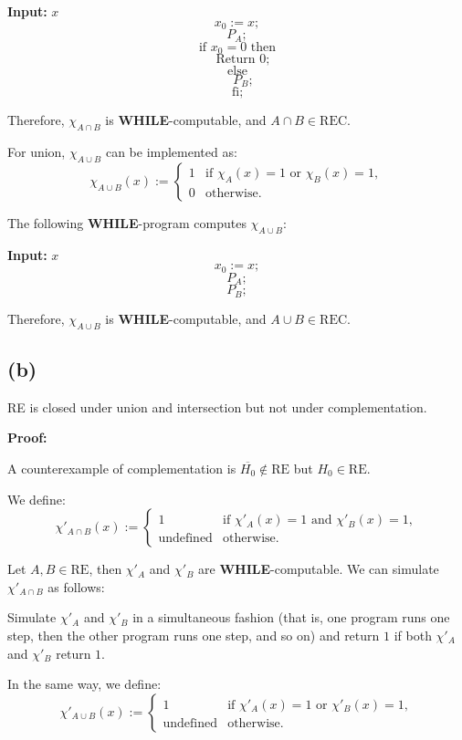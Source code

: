 \bigskip

\textbf{Input:} $x$
\[
x_0 := x;
\]
\[
P_A;
\]
\[
\text{if } x_0 = 0 \text{ then}
\]
\[
\quad \text{Return } 0;
\]
\[
\text{else}
\]
\[
\quad P_B;
\]
\[
\text{fi;}
\]

Therefore, $\chi_{A \cap B}$ is \textbf{WHILE}-computable, and $A \cap B \in \text{REC}$.

\bigskip

For union, $\chi_{A \cup B}$ can be implemented as:
\[
\chi_{A \cup B}(x) :=
\begin{cases}
    1 & \text{if } \chi_A(x) = 1 \text{ or } \chi_B(x) = 1, \\
    0 & \text{otherwise}.
\end{cases}
\]

The following \textbf{WHILE}-program computes $\chi_{A \cup B}$:

\bigskip

\textbf{Input:} $x$
\[
x_0 := x;
\]
\[
P_A;
\]
\[
P_B;
\]
\bigskip

\noindent
Therefore, $\chi_{A \cup B}$ is \textbf{WHILE}-computable, and $A \cup B \in \text{REC}$.


\subsection{(b)}


RE is closed under union and intersection but not under complementation.

\textbf{Proof:}

A counterexample of complementation is $\overline{H_0} \notin \text{RE}$ but $H_0 \in \text{RE}$.

We define:
\[
\chi'_{A \cap B}(x) :=
\begin{cases}
    1 & \text{if } \chi'_A(x) = 1 \text{ and } \chi'_B(x) = 1, \\
    \text{undefined} & \text{otherwise}.
\end{cases}
\]

Let $A, B \in \text{RE}$, then $\chi'_A$ and $\chi'_B$ are \textbf{WHILE}-computable.  
We can simulate $\chi'_{A \cap B}$ as follows:

Simulate $\chi'_A$ and $\chi'_B$ in a simultaneous fashion (that is, one program runs one step, then the other program runs one step, and so on) and return $1$ if both $\chi'_A$ and $\chi'_B$ return $1$.

\bigskip

In the same way, we define:
\[
\chi'_{A \cup B}(x) :=
\begin{cases}
    1 & \text{if } \chi'_A(x) = 1 \text{ or } \chi'_B(x) = 1, \\
    \text{undefined} & \text{otherwise}.
\end{cases}
\]

